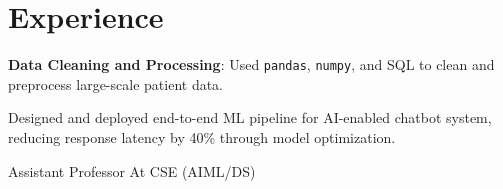 \documentclass[]{deedy-resume-reversed}
\begin{document}
\begin{minipage}[t]{0.60\textwidth}


\section{Experience}
\vspace{\topsep}
\begin{tightemize}
    \item \textbf{Data Cleaning and Processing}: Used \texttt{pandas}, \texttt{numpy}, and SQL to clean and preprocess large-scale patient data.
\end{tightemize}
\vspace{\topsep}
\begin{tightemize}
    \item Designed and deployed end-to-end ML pipeline for AI-enabled chatbot system, reducing response latency by 40\% through model optimization.
\end{tightemize}

\begin{tightemize}
    \item Assistant Professor At CSE (AIML/DS)
\end{tightemize}
\sectionsep




\end{minipage}
\end{document}
